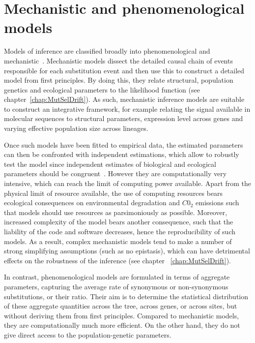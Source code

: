 \section{Mechanistic and phenomenological models}
\label{sec:mechanistic-and-phenomenological-models}

Models of inference are classified broadly into phenomenological and mechanistic~\citep{Rodrigue2010a}.
Mechanistic models dissect the detailed causal chain of events responsible for each substitution event and then use this to construct a detailed model from first principles.
By doing this, they relate structural, population genetics and ecological parameters to the likelihood function (see chapter~\ref{chap:MutSelDrift}).
As such, mechanistic inference models are suitable to construct an integrative framework, for example relating the signal available in molecular sequences to structural parameters, expression level across genes and varying effective population size across lineages.

Once such models have been fitted to empirical data, the estimated parameters can then be confronted with independent estimations, which allow to robustly test the model since independent estimates of biological and ecological parameters should be congruent~\citep{Dasmeh2014}.
However they are computationally very intensive, which can reach the limit of computing power available.
Apart from the physical limit of resource available, the use of computing resources bears ecological consequences on environmental degradation and $C0_2$ emissions such that models should use resources as parsimoniously as possible.
Moreover, increased complexity of the model bears another consequence, such that the liability of the code and software decreases, hence the reproducibility of such models.
As a result, complex mechanistic models tend to make a number of strong simplifying assumptions (such as no epistasis), which can have detrimental effects on the robustness of the inference (see chapter ~\ref{chap:MutSelDrift}).

In contrast, phenomenological models are formulated in terms of aggregate parameters, capturing the average rate of synonymous or non-synonymous substitutions, or their ratio.
Their aim is to determine the statistical distribution of these aggregate quantities across the tree, across genes, or across sites, but without deriving them from first principles.
Compared to mechanistic models, they are computationally much more efficient.
On the other hand, they do not give direct access to the population-genetic parameters.

